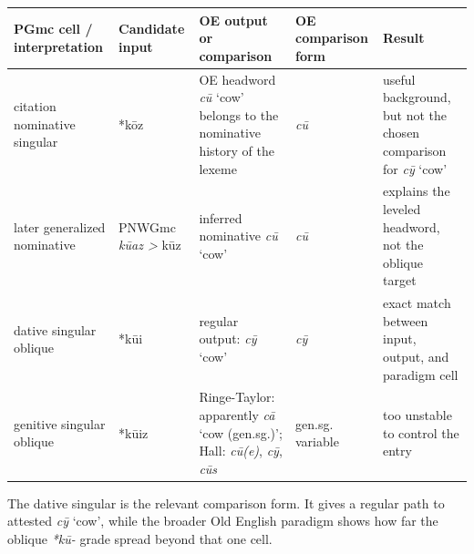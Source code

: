 \documentclass[
  british,
  a4paper,
  openany]{book}
\newcounter{none} %
\begin{document}
{\def\LTcaptype{none} %
\begin{longtable}[]{@{}
  >{\raggedright\arraybackslash}p{}
  >{\raggedright\arraybackslash}p{}
  >{\raggedright\arraybackslash}p{}
  >{\raggedright\arraybackslash}p{}
  >{\raggedright\arraybackslash}p{}@{}}
\toprule\noalign{}
\begin{minipage}[b]{\linewidth}\raggedright
PGmc cell / interpretation
\end{minipage} & \begin{minipage}[b]{\linewidth}\raggedright
Candidate input
\end{minipage} & \begin{minipage}[b]{\linewidth}\raggedright
OE output or comparison
\end{minipage} & \begin{minipage}[b]{\linewidth}\raggedright
OE comparison form
\end{minipage} & \begin{minipage}[b]{\linewidth}\raggedright
Result
\end{minipage} \\
\midrule\noalign{}
\endhead
\bottomrule\noalign{}
\endlastfoot
citation nominative singular & *kōz & OE headword {\emph{cū}} `cow'
belongs to the nominative history of the lexeme & \emph{cū} & useful
background, but not the chosen comparison for {\emph{cȳ}} `cow' \\
later generalized nominative & PNWGmc \emph{kūaz \textgreater{} }kūz &
inferred nominative {\emph{cū}} `cow' & \emph{cū} & explains the leveled
headword, not the oblique target \\
dative singular oblique & *kūi & regular output: {\emph{cȳ}} `cow' &
\emph{cȳ} & exact match between input, output, and paradigm cell \\
genitive singular oblique & *kūiz & Ringe-Taylor: apparently {\emph{cā}}
`cow (gen.sg.)'; Hall: \emph{cū(e)}, \emph{cȳ}, \emph{cūs} & gen.sg.
variable & too unstable to control the entry \\
\end{longtable}
}

The dative singular is the relevant comparison form. It gives a regular
path to attested {\emph{cȳ}} `cow', while the broader Old English
paradigm shows how far the oblique \emph{*kū-} grade spread beyond that
one cell.
\end{document}
